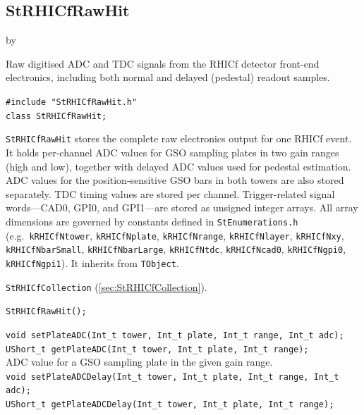 \documentclass[twoside]{article}
\newcommand{\entrylabel}[1]{\mbox{\textbf{{#1}}}\hfil}%
\newenvironment{entry}
{\begin{list}{}%
    {\renewcommand{\makelabel}{\entrylabel}%
     \setlength{\labelwidth}{90pt}%
     \setlength{\leftmargin}{\labelwidth}
     \advance\leftmargin by \labelsep%
      }%
    }%
  {\end{list}}
\newcommand{\Entrylabel}[1]%
{\raisebox{0pt}[1ex][0pt]{\makebox[\labelwidth][l]%
    {\parbox[t]{\labelwidth}{\hspace{0pt}\textbf{{#1}}}}}}
\newenvironment{Entry}%
{\renewcommand{\entrylabel}{\Entrylabel}\begin{entry}}%
  {\end{entry}}
\begin{document}
\subsection{StRHICfRawHit}
\label{sec:StRHICfRawHit}
\begin{Entry}
\item[Summary] Raw digitised ADC and TDC signals from the RHICf detector
    front-end electronics, including both normal and delayed (pedestal) readout
    samples.
\item[Synopsis]
    \verb+#include "StRHICfRawHit.h"+\\
    \verb+class StRHICfRawHit;+\\
\item[Description]
    \texttt{StRHICfRawHit} stores the complete raw electronics output for one
    RHICf event.  It holds per-channel ADC values for GSO sampling plates in
    two gain ranges (high and low), together with delayed ADC values used for
    pedestal estimation.  ADC values for the position-sensitive GSO bars in both
    towers are also stored separately.  TDC timing values are stored per channel.
    Trigger-related signal words---CAD0, GPI0, and GPI1---are stored as unsigned
    integer arrays.  All array dimensions are governed by constants defined in
    \texttt{StEnumerations.h} (e.g.\ \texttt{kRHICfNtower}, \texttt{kRHICfNplate},
    \texttt{kRHICfNrange}, \texttt{kRHICfNlayer}, \texttt{kRHICfNxy},
    \texttt{kRHICfNbarSmall}, \texttt{kRHICfNbarLarge}, \texttt{kRHICfNtdc},
    \texttt{kRHICfNcad0}, \texttt{kRHICfNgpi0}, \texttt{kRHICfNgpi1}).
    It inherits from \texttt{TObject}.
\item[Related Classes]
    \texttt{StRHICfCollection} (\ref{sec:StRHICfCollection}).
\item[Public\\ Constructors]
    \verb+StRHICfRawHit();+\\
\item[Public Member\\ Functions]
    \verb+void setPlateADC(Int_t tower, Int_t plate, Int_t range, Int_t adc);+\\
    \verb+UShort_t getPlateADC(Int_t tower, Int_t plate, Int_t range);+\\
    ADC value for a GSO sampling plate in the given gain range.\\
    \verb+void setPlateADCDelay(Int_t tower, Int_t plate, Int_t range, Int_t adc);+\\
    \verb+UShort_t getPlateADCDelay(Int_t tower, Int_t plate, Int_t range);+\\

\end{Entry}
\end{document}
